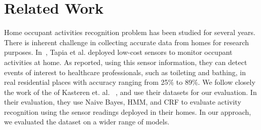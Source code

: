\section{Related Work}\label{sec:related}

Home occupant activities recognition problem has been studied for several years. There is inherent challenge in collecting accurate data from homes for research purposes. In~\cite{emtapia}, Tapia et al. deployed low-cost sensors to monitor occupant activities at home. As reported, using this sensor information, they can detect events of interest to healthcare professionals, such as toileting and bathing, in real residential places with accuracy ranging from 25\% to 89\%. 
We follow closely the work of the of Kasteren et. al. ~\cite{tvkasteren,tvkasteren2010}, and use their datasets for our evaluation. In their evaluation, they use Naive Bayes, HMM, and CRF to evaluate activity recognition using the sensor readings deployed in their homes. In our approach, we evaluated the dataset on a wider range of models. 



